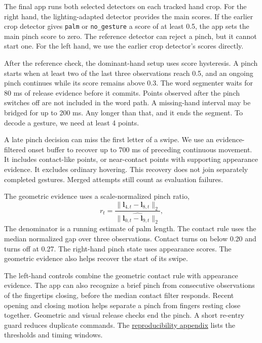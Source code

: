 \documentclass[preprint,12pt]{elsarticle}
\begin{document}
The final app runs both selected detectors on each tracked hand crop. For the right hand, the lighting-adapted detector provides the main scores. If the earlier crop detector gives \texttt{palm} or \texttt{no\_gesture} a score of at least 0.5, the app sets the main pinch score to zero. The reference detector can reject a pinch, but it cannot start one. For the left hand, we use the earlier crop detector's scores directly.

After the reference check, the dominant-hand setup uses score hysteresis. A pinch starts when at least two of the last three observations reach 0.5, and an ongoing pinch continues while its score remains above 0.3. The word segmenter waits for 80 ms of release evidence before it commits. Points observed after the pinch switches off are not included in the word path. A missing-hand interval may be bridged for up to 200 ms. Any longer than that, and it ends the segment. To decode a gesture, we need at least 4 points.

A late pinch decision can miss the first letter of a swipe. We use an evidence-filtered onset buffer to recover up to 700 ms of preceding continuous movement. It includes contact-like points, or near-contact points with supporting appearance evidence. It excludes ordinary hovering. This recovery does not join separately completed gestures. Merged attempts still count as evaluation failures.

The geometric evidence uses a scale-normalized pinch ratio,
\begin{equation}
r_t=\frac{\lVert\mathbf{l}_{4,t}-\mathbf{l}_{8,t}\rVert_2}
{\widehat{\lVert\mathbf{l}_{0,t}-\mathbf{l}_{9,t}\rVert_2}},
\end{equation}
The denominator is a running estimate of palm length. The contact rule uses the median normalized gap over three observations. Contact turns on below 0.20 and turns off at 0.27. The right-hand pinch state uses appearance scores. The geometric evidence also helps recover the start of its swipe.

The left-hand controls combine the geometric contact rule with appearance evidence. The app can also recognize a brief pinch from consecutive observations of the fingertips closing, before the median contact filter responds. Recent opening and closing motion helps separate a pinch from fingers resting close together. Geometric and visual release checks end the pinch. A short re-entry guard reduces duplicate commands. The \hyperref[app:reproducibility]{reproducibility appendix} lists the thresholds and timing windows.
\end{document}
